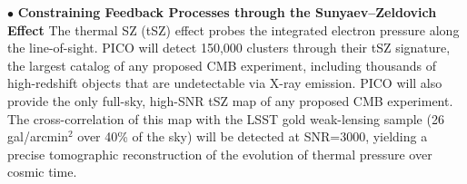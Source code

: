 \documentclass[PICOAPC.tex]{subfiles}
\begin{document}
%
$\bullet$ {\bf Constraining Feedback Processes through the Sunyaev--Zeldovich Effect} \hspace{0.1in} \label{sec:sz}
The thermal SZ (tSZ) effect probes the integrated electron pressure along the line-of-sight.  PICO will detect 150,000 clusters through their tSZ signature, the largest catalog of any proposed CMB experiment, including thousands of high-redshift objects that are undetectable via X-ray emission.  PICO will also provide the only full-sky, high-\ac{SNR} tSZ map of any proposed CMB experiment.  The cross-correlation of this map with the LSST gold weak-lensing sample (26 gal/arcmin$^2$ over 40\% of the sky) will be detected at \ac{SNR}=3000, yielding a precise tomographic reconstruction of the evolution of thermal pressure over cosmic time.

\end{document}
